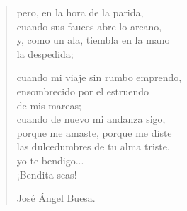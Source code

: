 \documentclass[11pt, portrait, twoside, notitlepage, openright]{book}
\begin{document}
\begin{verse}
pero, en la hora de la parida,\\
cuando sus fauces abre lo arcano,\\
y, como un ala, tiembla en la mano\\
la despedida;
\newpage

cuando mi viaje sin rumbo emprendo,\\
ensombrecido por el estruendo\\
de mis mareas;\\
cuando de nuevo mi andanza sigo,\\
porque me amaste, porque me diste\\
las dulcedumbres de tu alma triste,\\
yo te bendigo...\\
¡Bendita seas!
\newline

José Ángel Buesa.
\end{verse}
\end{document}
